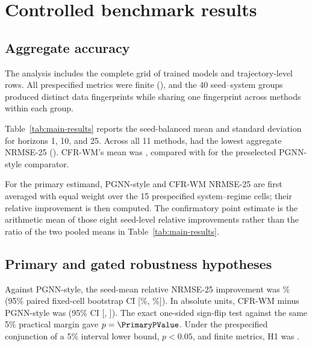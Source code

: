 \section{Controlled benchmark results}

\subsection{Aggregate accuracy}

The analysis includes the complete grid of \ConfirmatoryRuns{}
trained models and \ConfirmatoryTrajectories{} trajectory-level rows. All
prespecified metrics were finite (\AllMetricsFinite), and the 40 seed--system
groups produced \UniqueDataHashes{} distinct data fingerprints while sharing
one fingerprint across methods within each group.

Table~\ref{tab:main-results} reports the seed-balanced mean and standard
deviation for horizons 1, 10, and 25. Across all 11 methods, \BestMethod{}
had the lowest aggregate NRMSE-25 (\BestNRMSE). CFR-WM's mean was
\CFRNRMSE{}, compared with \PGNNNRMSE{} for the preselected PGNN-style comparator.

\begin{table}[t]
\centering
\caption{Confirmatory accuracy over the fixed five-system, three-regime
benchmark. Entries are means $\pm$ SD across eight seed-level, cell-balanced
aggregates. Bold marks the lowest aggregate NRMSE-25. Parameter counts are means
over the five system-specific input dimensions; all methods received the same six-trial
validation search budget.}
\label{tab:main-results}
\resizebox{\textwidth}{!}{}
\end{table}

For the primary estimand, PGNN-style and CFR-WM
NRMSE-25 are first averaged with equal weight over the 15 prespecified
system--regime cells; their relative improvement is then computed. The
confirmatory point estimate is the arithmetic mean of those eight seed-level
relative improvements rather than the ratio of the two pooled means in
Table~\ref{tab:main-results}.

\subsection{Primary and gated robustness hypotheses}

Against PGNN-style, the seed-mean relative NRMSE-25 improvement was
\PrimaryImprovement\% (95\% paired fixed-cell bootstrap CI
[\PrimaryRelativeCILow\%, \PrimaryRelativeCIHigh\%]). In absolute units,
CFR-WM minus PGNN-style was \PrimaryDifference{} (95\% CI [\PrimaryCILow,
\PrimaryCIHigh]). The exact one-sided sign-flip test against the same 5\%
practical margin gave $p=\PrimaryPValue$. Under the prespecified conjunction of a
5\% interval lower bound, $p<0.05$, and finite metrics, H1 was
\PrimaryDecision.

